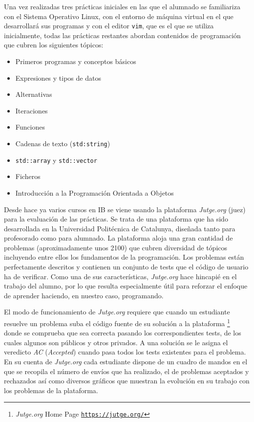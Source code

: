 \documentclass[twocolumn,twoside,a4paper, 10pt]{article}
\newcommand{\jutge}{\textit{Jutge.org}{}}           %
\begin{document}
Una vez realizadas tres prácticas iniciales en las que el alumnado se familiariza con el Sistema Operativo
Linux, con el entorno de máquina virtual en el que desarrollará sus programas y con el editor \texttt{vim}, 
que es el que se utiliza inicialmente, todas las prácticas restantes abordan contenidos de programación que
cubren los siguientes tópicos:
\begin{itemize}
  \item Primeros programas y conceptos básicos
  \item Expresiones y tipos de datos
  \item Alternativas
  \item Iteraciones
  \item Funciones
  \item Cadenas de texto (\texttt{std:string})
  \item \texttt{std::array} y \texttt{std::vector}
  \item Ficheros
  \item Introducción a la Programación Orientada a Objetos
\end{itemize}

Desde hace ya varios cursos en IB se viene usando la plataforma \jutge{} (juez) 
\cite{Petit:Jutge:2018} para la evaluación de las prácticas.
Se trata de una plataforma que ha sido desarrollada en la Universidad Politécnica de Catalunya,
diseñada tanto para profesorado como para alumnado.
La plataforma aloja una gran cantidad de problemas (aproximadamente unos 2100) que cubren diversidad de
tópicos incluyendo entre ellos los fundamentos de la programación.
Los problemas están perfectamente descritos y contienen un conjunto de tests que el código de usuario ha de
verificar.
Como una de sus características, \jutge{} hace hincapié en el trabajo del alumno, por lo que 
resulta especialmente útil para reforzar el enfoque de aprender haciendo, en nuestro caso, programando.

El modo de funcionamiento de \jutge{} requiere que cuando un estudiante resuelve un problema suba el código
fuente de su solución a la plataforma
\footnote{\textit{Jutge.org} Home Page \href{https://jutge.org/}{\scriptsize{\texttt{https://jutge.org/}}}}
donde se comprueba que sea correcta pasando los correspondientes tests, de los cuales algunos son públicos
y otros privados.
A una solución se le asigna el veredicto \textit{AC} (\textit{Accepted}) cuando pasa todos los tests existentes para el problema.
En su cuenta de \jutge{} cada estudiante dispone de un cuadro de mandos en el que se recopila el número de
envíos que ha realizado, el de problemas aceptados y rechazados así como diversos gráficos que muestran la
evolución en su trabajo con los problemas de la plataforma.
\end{document}

